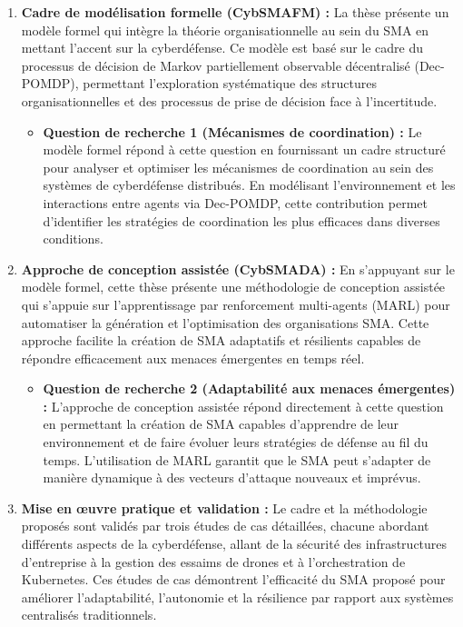 \begin{enumerate}
    \item \textbf{Cadre de modélisation formelle (CybSMAFM) :} La thèse présente un modèle formel qui intègre la théorie organisationnelle au sein du SMA en mettant l'accent sur la cyberdéfense. Ce modèle est basé sur le cadre du processus de décision de Markov partiellement observable décentralisé (Dec-POMDP), permettant l'exploration systématique des structures organisationnelles et des processus de prise de décision face à l'incertitude.

          \begin{itemize}
              \item \textbf{Question de recherche 1 (Mécanismes de coordination) :} Le modèle formel répond à cette question en fournissant un cadre structuré pour analyser et optimiser les mécanismes de coordination au sein des systèmes de cyberdéfense distribués. En modélisant l'environnement et les interactions entre agents via Dec-POMDP, cette contribution permet d'identifier les stratégies de coordination les plus efficaces dans diverses conditions.
          \end{itemize}

    \item \textbf{Approche de conception assistée (CybSMADA) :} En s'appuyant sur le modèle formel, cette thèse présente une méthodologie de conception assistée qui s'appuie sur l'apprentissage par renforcement multi-agents (MARL) pour automatiser la génération et l'optimisation des organisations SMA. Cette approche facilite la création de SMA adaptatifs et résilients capables de répondre efficacement aux menaces émergentes en temps réel.

          \begin{itemize}
              \item \textbf{Question de recherche 2 (Adaptabilité aux menaces émergentes) :} L'approche de conception assistée répond directement à cette question en permettant la création de SMA capables d'apprendre de leur environnement et de faire évoluer leurs stratégies de défense au fil du temps. L'utilisation de MARL garantit que le SMA peut s'adapter de manière dynamique à des vecteurs d'attaque nouveaux et imprévus.
          \end{itemize}

    \item \textbf{Mise en œuvre pratique et validation :} Le cadre et la méthodologie proposés sont validés par trois études de cas détaillées, chacune abordant différents aspects de la cyberdéfense, allant de la sécurité des infrastructures d'entreprise à la gestion des essaims de drones et à l'orchestration de Kubernetes. Ces études de cas démontrent l'efficacité du SMA proposé pour améliorer l'adaptabilité, l'autonomie et la résilience par rapport aux systèmes centralisés traditionnels.


\end{enumerate}
